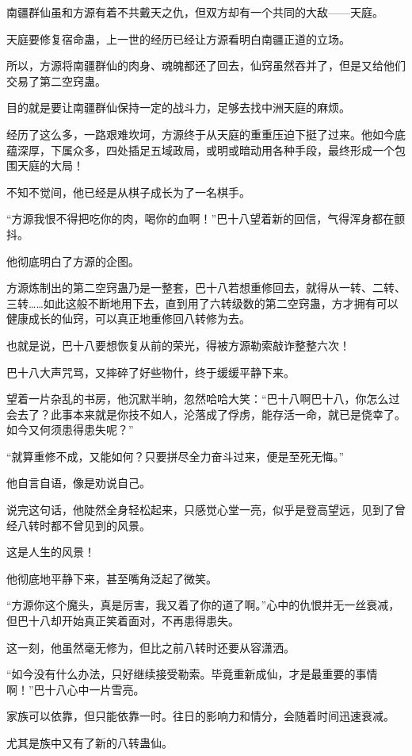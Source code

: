 \begin{this_body}
南疆群仙虽和方源有着不共戴天之仇，但双方却有一个共同的大敌——天庭。

天庭要修复宿命蛊，上一世的经历已经让方源看明白南疆正道的立场。

所以，方源将南疆群仙的肉身、魂魄都还了回去，仙窍虽然吞并了，但是又给他们交易了第二空窍蛊。

目的就是要让南疆群仙保持一定的战斗力，足够去找中洲天庭的麻烦。

经历了这么多，一路艰难坎坷，方源终于从天庭的重重压迫下挺了过来。他如今底蕴深厚，下属众多，四处插足五域政局，或明或暗动用各种手段，最终形成一个包围天庭的大局！

不知不觉间，他已经是从棋子成长为了一名棋手。

“方源我恨不得把吃你的肉，喝你的血啊！”巴十八望着新的回信，气得浑身都在颤抖。

他彻底明白了方源的企图。

方源炼制出的第二空窍蛊乃是一整套，巴十八若想重修回去，就得从一转、二转、三转……如此这般不断地用下去，直到用了六转级数的第二空窍蛊，方才拥有可以健康成长的仙窍，可以真正地重修回八转修为去。

也就是说，巴十八要想恢复从前的荣光，得被方源勒索敲诈整整六次！

巴十八大声咒骂，又摔碎了好些物什，终于缓缓平静下来。

望着一片杂乱的书房，他沉默半晌，忽然哈哈大笑：“巴十八啊巴十八，你怎么过会去了？此事本来就是你技不如人，沦落成了俘虏，能存活一命，就已是侥幸了。如今又何须患得患失呢？”

“就算重修不成，又能如何？只要拼尽全力奋斗过来，便是至死无悔。”

他自言自语，像是劝说自己。

说完这句话，他陡然全身轻松起来，只感觉心堂一亮，似乎是登高望远，见到了曾经八转时都不曾见到的风景。

这是人生的风景！

他彻底地平静下来，甚至嘴角泛起了微笑。

“方源你这个魔头，真是厉害，我又着了你的道了啊。”心中的仇恨并无一丝衰减，但巴十八却开始真正笑着面对，不再患得患失。

这一刻，他虽然毫无修为，但比之前八转时还要从容潇洒。

“如今没有什么办法，只好继续接受勒索。毕竟重新成仙，才是最重要的事情啊！”巴十八心中一片雪亮。

家族可以依靠，但只能依靠一时。往日的影响力和情分，会随着时间迅速衰减。

尤其是族中又有了新的八转蛊仙。


\end{this_body}

